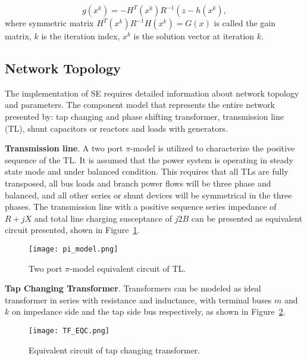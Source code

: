 \begin{equation}
    g\left(x^{k}\right)=-H^{T}\left(x^{k}\right) R^{-1}\left(z-h\left(x^{k}\right)\right.,
\end{equation}
where symmetric matrix \(H^{T}\left(x^{k}\right) R^{-1} H\left(x^{k}\right)=G(x)\) is  called the gain matrix, $k$ is the iteration index, $x^k$ is the solution vector at iteration $k$.

\subsection{Network Topology}\label{subsec:ch1/sec4/sub2}
The implementation of SE requires detailed information about network topology and parameters. The component model that represents the entire network presented by: tap changing and phase shifting transformer, transmission line (TL), shunt capacitors or reactors and loads with generators.  


\textbf{Transmission line}. A two port $\pi$-model is utilized to characterize the positive sequence of the TL. It is assumed that the power system is operating in steady state mode and under balanced condition. This requires that all TLs are fully transposed, all bus loads and branch power flows will be three phase and balanced,  and all other series or shunt devices will be symmetrical in the three phases. The transmission line with a positive sequence series impedance of \(R + jX\) and total line charging susceptance of $j2B$ can be presented as equivalent circuit presented, shown in Figure~\cref{fig:pi_model}.

\begin{figure}[htbp]
    \centering
    \texttt{[image: pi\_model.png]}
    \caption{Two port $\pi$-model equivalent circuit of TL.}
    \label{fig:pi_model}
\end{figure}

\textbf{Tap Changing Transformer}. Transformers can be modeled as ideal transformer in series with resistance and inductance, with terminal buses $m$ and $k$ on impedance side and the tap side bus respectively, as shown in Figure~\cref{fig:tf_eqc}.

\begin{figure}[htbp]
    \centering
    \texttt{[image: TF\_EQC.png]}
    \caption{Equivalent circuit of tap changing transformer.}
    \label{fig:tf_eqc}
\end{figure}

